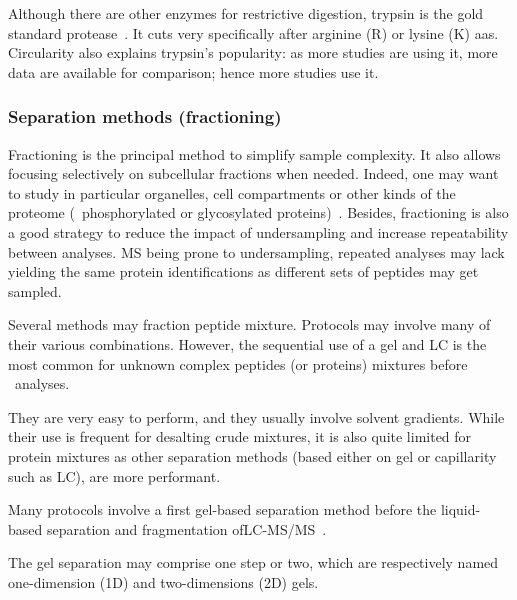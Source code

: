 Although there are other enzymes for restrictive digestion,
trypsin is the gold standard protease~.
It cuts very specifically after arginine (R) or lysine (K) \glspl{aa}.
Circularity also explains trypsin's popularity:
as more studies are using it, more data are available for comparison;
hence more studies use it.

\subsubsection{Separation methods (fractioning)}\label{subsub:sepMethods}
Fractioning is the principal method to simplify sample complexity. It also allows
focusing selectively on subcellular fractions when needed. Indeed, one may want
to study in particular organelles, cell compartments or other kinds of the proteome
(\eg\ phosphorylated or glycosylated proteins)~. Besides,
fractioning is also a good strategy to reduce the impact of undersampling and
increase repeatability between analyses.
\gls{MS} being prone to undersampling,
repeated analyses may lack yielding the same
protein identifications as different sets of peptides may get sampled.

Several methods may fraction peptide mixture. Protocols may involve many of their
various combinations. However, the sequential use of a gel and \gls{LC} is
the most common for unknown complex peptides (or proteins) mixtures before
\ms\ analyses.

They are very easy to perform, and they usually involve solvent gradients. While
their use is frequent for desalting crude mixtures, it is also quite limited
for protein mixtures as other separation methods (based either on gel or
capillarity such as \gls{LC}), are more performant.

Many protocols involve a first gel-based separation method before the
liquid-based separation and fragmentation of\enspace\gls{LC-MS/MS}~.

The gel separation may comprise one step or two, which are respectively named
one-dimension (1D) and two-dimensions (2D) gels.


